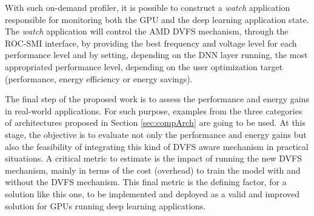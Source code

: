With such on-demand profiler, it is possible to construct a \textit{watch} application responsible for monitoring both the GPU and the deep learning application state. The \textit{watch} application will control the AMD DVFS mechanism, through the ROC-SMI interface, by providing the best frequency and voltage level for each performance level and by setting, depending on the DNN layer running, the most appropriated performance level, depending on the user optimization target (performance, energy efficiency or energy savings).

The final step of the proposed work is to assess the performance and energy gains in real-world applications. For such purpose, examples from the three categories of architectures proposed in Section \ref{sec:compArch} are going to be used. At this stage, the objective is to evaluate not only the performance and energy gains but also the feasibility of integrating this kind of DVFS aware mechanism in practical situations. A critical metric to estimate is the impact of running the new DVFS mechanism, mainly in terms of the cost (overhead) to train the model with and without the DVFS mechanism. This final metric is the defining factor, for a solution like this one, to be implemented and deployed as a valid and improved solution for GPUs running deep learning applications.



